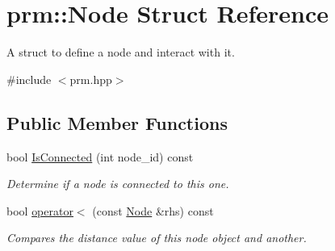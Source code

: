 \hypertarget{structprm_1_1Node}{}\section{prm\+:\+:Node Struct Reference}
\label{structprm_1_1Node}


A struct to define a node and interact with it.  




{\ttfamily \#include $<$prm.\+hpp$>$}

\subsection*{Public Member Functions}
\begin{DoxyCompactItemize}
\item 
bool \hyperlink{structprm_1_1Node_a166ab395f8fcb59f5d5367ca45f7bf51}{Is\+Connected} (int node\+\_\+id) const
\begin{DoxyCompactList}\small\item\em Determine if a node is connected to this one. \end{DoxyCompactList}\item 
bool \hyperlink{structprm_1_1Node_ad414f13a52664be229be3a594613fb45}{operator$<$} (const \hyperlink{structprm_1_1Node}{Node} \&rhs) const
\begin{DoxyCompactList}\small\item\em Compares the distance value of this node object and another. \end{DoxyCompactList}\end{DoxyCompactItemize}
